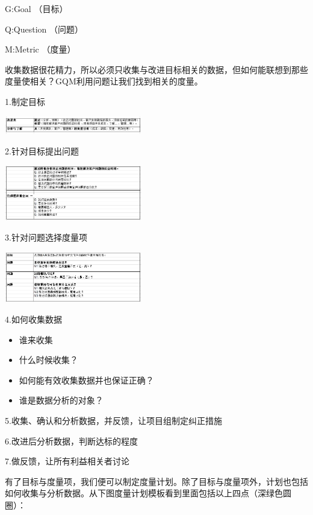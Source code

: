 \begin{description}
\tightlist
\item[]
G:Goal （目标）

Q:Question （问题）

M:Metric （度量）
\end{description}

收集数据很花精力，所以必须只收集与改进目标相关的数据，但如何能联想到那些度量使相关？GQM利用问题让我们找到相关的度量。

1.制定目标

\includegraphics[width=6cm]{Gqm1Screenshot_2023-11-01_113815.jpg}

2.针对目标提出问题

\includegraphics[width=6cm]{Gqm2Screenshot_2023-11-01_114014.jpg}

3.针对问题选择度量项

\includegraphics[width=6cm]{Gqm3Screenshot_2023-11-01_114048.jpg}

4.如何收集数据

\begin{itemize}
\tightlist
\item
  谁来收集
\item
  什么时候收集？
\item
  如何能有效收集数据并也保证正确？
\item
  谁是数据分析的对象？
\end{itemize}

5.收集、确认和分析数据，并反馈，让项目组制定纠正措施

6.改进后分析数据，判断达标的程度

7.做反馈，让所有利益相关者讨论

有了目标与度量项，我们便可以制定度量计划。除了目标与度量项外，计划也包括如何收集与分析数据。从下图度量计划模板看到里面包括以上四点（深绿色圆圈）：


